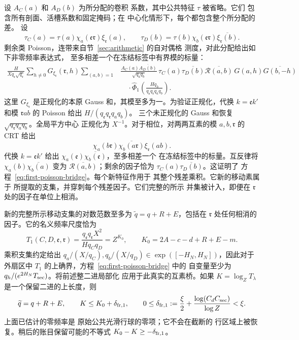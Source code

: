 \documentclass[11pt,a4paper]{article}
\numberwithin{equation}{section}
\numberwithin{figure}{section}
\theoremstyle{definition}
\theoremstyle{remark}
\begin{document}
设 \(A_C(a)\) 和 \(A_D(b)\) 为所分配的卷积
系数，其中公共特征 \(\tau\) 被省略。它们
包含所有剖面、活槽系数和固定掩码；在
中心化情形下，每个都包含整个所分配的差。
设
\[
 \tau_C(a)=\tau(a)\chi_a(\mathfrak e\mathfrak r)
                       \xi_{\mathfrak r}(a),\qquad
 \tau_D(b)=\tau(b)\chi_b(\mathfrak e\mathfrak r)
                       \overline{\xi_{\mathfrak r}(b)}.
\]
剩余类 Poisson，连带来自节~\ref{sec:arithmetic} 的自对偶格
测度，对此分配给出如下非零频率表达式，
至多相差一个在冻结标签中有界模的标量：
\begin{equation}
 \begin{split}
 \frac{H}{Xq_{\mathfrak e}\sqrt{q_{\mathfrak r}}}
 \sum_{h\ne0}G_{\xi_{\mathfrak r}}(\mathfrak r,h)
 \sum_{(a,b)=1}
 &\frac{A_C(a)\overline{A_D(b)}}{\sqrt{q_aq_b}}\,
 \tau_C(a)\overline{\tau_D(b)}
 \overline{\mathcal R(a,b)}\,
 G(a,h)\overline{G(b,-h)}
 \\
 &\quad\cdot
 \widehat\Phi_1\left(
    \frac{Hq_h}{q_{\mathfrak e}q_{\mathfrak r}q_aq_b}
                    \right).
 \end{split}
 \label{eq:first-poisson-bridge}
\end{equation}
这里 \(G_{\xi_{\mathfrak r}}\) 是正规化的本原 Gauss
和，其模至多为一。为验证正规化，代换
\(k=\mathfrak e k'\) 和模
\(\mathfrak r ab\) 的 Poisson 给出 \(H/(q_{\mathfrak e}q_{\mathfrak r}q_aq_b)\)。
三个未正规化的 Gauss 和恢复
\(\sqrt{q_{\mathfrak r}q_aq_b}\)。全局平方中心
正规化为 \(X^{-1}\)。对于相位，对两两互素的模
\(a,b,\mathfrak r\) 的 CRT 给出
\[
 \chi_a(b\mathfrak r)\overline{\chi_b(a\mathfrak r)}
       \xi_{\mathfrak r}(ab).
\]
代换 \(k=\mathfrak e k'\) 给出
\(\chi_a(\mathfrak e)\overline{\chi_b(\mathfrak e)}\)，至多相差一个
在冻结标签中的标量。互反律将
\(\chi_a(b)\overline{\chi_b(a)}\) 变为
\(\overline{\mathcal R(a,b)}\)；剩余的因子恰为
\(\tau_C(a)\overline{\tau_D(b)}\)。这证明了
方程~\eqref{eq:first-poisson-bridge}。每个新特征作用于
其整个残差乘积。它新的移动素属于
所提取的支集，并穿刺每个残差因子。它们完整的所示
并集被计入，即便在 \(\mathfrak r\) 处的因子在单位上相消。

新的完整所示移动支集的对数范数至多为
\(\widetilde q=q+R+E\)，包括在
\(\mathfrak r\) 处任何相消的因子。它的名义频率尺度恰为
\[
 T_1(C,D,\mathfrak e,\mathfrak r)
 =\frac{q_{\mathfrak e}q_{\mathfrak r}X^2}
        {Hq_Cq_D}=Z^{K_0},
 \qquad K_0=2A-c-d+R+E-m.
\]
乘积支集约定给出
\(q_a/(X/q_C),q_b/(X/q_D)\in\exp([-H_N,H_N])\)，因此对于
外扇区中 \(T_1\) 的上确界，方程~\eqref{eq:first-poisson-bridge} 中的
自变量至少为
\(q_h/(e^{2H_N}T_{\rm sec})\)。将前述整二进局部化
应用于此真实的互素桥。如果 \(K=\log_ZT_\lambda\)
是一个保留二进的上长度，则
\begin{equation}
 \widetilde q=q+R+E,\qquad
 K\le K_0+\delta_{{\rm fr},1},\qquad
 0\le\delta_{{\rm fr},1}:=\frac\xi2+
       \frac{\log(C_dC_{\rm sec})}{\log Z}<\xi.
 \label{old-eq:2.3}
\end{equation}
上面已估计的零频率是
原始公共光滑行球的零项；它不会在截断的
行区域上被恢复。稍后的账目保留可能的不等式
\(K_0-K\ge-\delta_{{\rm fr},1}\)。
\end{document}
